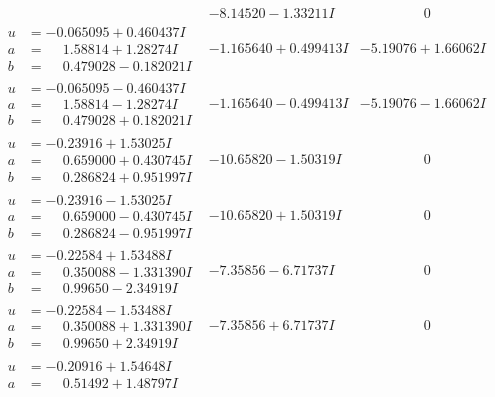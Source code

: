 \documentclass[1p]{elsarticle_modified}
\theoremstyle{definition}
\begin{document}
$$\begin{array}{c|c|c}
 & -8.14520 - 1.33211 I & \phantom{-0.000000 } 0 \\ \hline\begin{aligned}
u &= -0.065095 + 0.460437 I \\
a &= \phantom{-}1.58814 + 1.28274 I \\
b &= \phantom{-}0.479028 - 0.182021 I\end{aligned}
 & -1.165640 + 0.499413 I & -5.19076 + 1.66062 I \\ \hline\begin{aligned}
u &= -0.065095 - 0.460437 I \\
a &= \phantom{-}1.58814 - 1.28274 I \\
b &= \phantom{-}0.479028 + 0.182021 I\end{aligned}
 & -1.165640 - 0.499413 I & -5.19076 - 1.66062 I \\ \hline\begin{aligned}
u &= -0.23916 + 1.53025 I \\
a &= \phantom{-}0.659000 + 0.430745 I \\
b &= \phantom{-}0.286824 + 0.951997 I\end{aligned}
 & -10.65820 - 1.50319 I & \phantom{-0.000000 } 0 \\ \hline\begin{aligned}
u &= -0.23916 - 1.53025 I \\
a &= \phantom{-}0.659000 - 0.430745 I \\
b &= \phantom{-}0.286824 - 0.951997 I\end{aligned}
 & -10.65820 + 1.50319 I & \phantom{-0.000000 } 0 \\ \hline\begin{aligned}
u &= -0.22584 + 1.53488 I \\
a &= \phantom{-}0.350088 - 1.331390 I \\
b &= \phantom{-}0.99650 - 2.34919 I\end{aligned}
 & -7.35856 - 6.71737 I & \phantom{-0.000000 } 0 \\ \hline\begin{aligned}
u &= -0.22584 - 1.53488 I \\
a &= \phantom{-}0.350088 + 1.331390 I \\
b &= \phantom{-}0.99650 + 2.34919 I\end{aligned}
 & -7.35856 + 6.71737 I & \phantom{-0.000000 } 0 \\ \hline\begin{aligned}
u &= -0.20916 + 1.54648 I \\
a &= \phantom{-}0.51492 + 1.48797 I \\

\end{aligned}
\end{array}$$
\end{document}
